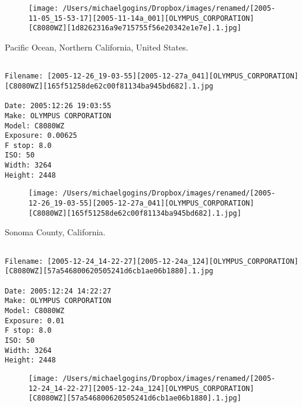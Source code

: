 \documentclass[11pt,letter,DIV=14,paper=landscape]{scrbook}
\begin{document}
\begin{figure}
\texttt{[image: /Users/michaelgogins/Dropbox/images/renamed/[2005-11-05\_15-53-17][2005-11-14a\_001][OLYMPUS\_CORPORATION][C8080WZ][1d8262316a9e715755f56e20342e1e7e].1.jpg]}
\end{figure}
    
\clearpage
\noindent Pacific Ocean, Northern California, United States.
\noindent
\begin{lstlisting}

Filename: [2005-12-26_19-03-55][2005-12-27a_041][OLYMPUS_CORPORATION][C8080WZ][165f51258de62c00f81134ba945bd682].1.jpg

Date: 2005:12:26 19:03:55
Make: OLYMPUS CORPORATION
Model: C8080WZ
Exposure: 0.00625
F stop: 8.0
ISO: 50
Width: 3264
Height: 2448
\end{lstlisting}
\clearpage

\begin{figure}
\texttt{[image: /Users/michaelgogins/Dropbox/images/renamed/[2005-12-26\_19-03-55][2005-12-27a\_041][OLYMPUS\_CORPORATION][C8080WZ][165f51258de62c00f81134ba945bd682].1.jpg]}
\end{figure}
    
\clearpage
\noindent Sonoma County, California.
\noindent
\begin{lstlisting}

Filename: [2005-12-24_14-22-27][2005-12-24a_124][OLYMPUS_CORPORATION][C8080WZ][57a546800620505241d6cb1ae06b1880].1.jpg

Date: 2005:12:24 14:22:27
Make: OLYMPUS CORPORATION
Model: C8080WZ
Exposure: 0.01
F stop: 8.0
ISO: 50
Width: 3264
Height: 2448
\end{lstlisting}
\clearpage

\begin{figure}
\texttt{[image: /Users/michaelgogins/Dropbox/images/renamed/[2005-12-24\_14-22-27][2005-12-24a\_124][OLYMPUS\_CORPORATION][C8080WZ][57a546800620505241d6cb1ae06b1880].1.jpg]}
\end{figure}
    
\end{document}
